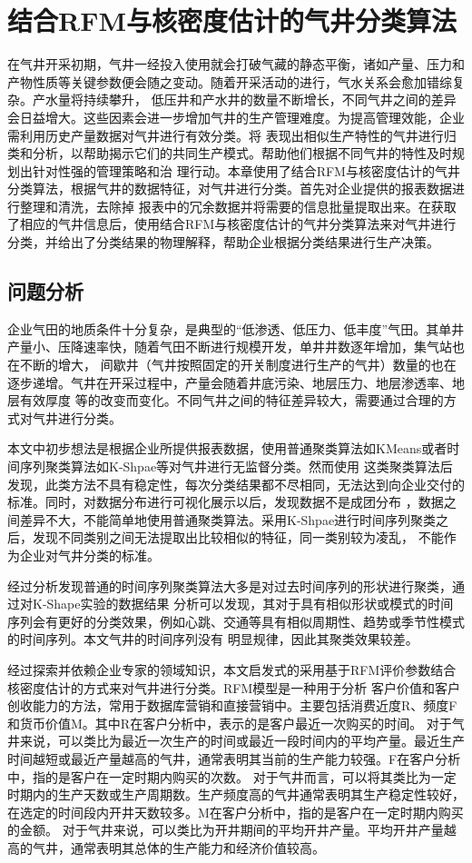 \chapter{结合RFM与核密度估计的气井分类算法}
在气井开采初期，气井一经投入使用就会打破气藏的静态平衡，诸如产量、压力和产物性质等关键参数便会随之变动。随着开采活动的进行，气水关系会愈加错综复杂。产水量将持续攀升，
低压井和产水井的数量不断增长，不同气井之间的差异会日益增大。这些因素会进一步增加气井的生产管理难度。为提高管理效能，企业需利用历史产量数据对气井进行有效分类。将
表现出相似生产特性的气井进行归类和分析，以帮助揭示它们的共同生产模式。帮助他们根据不同气井的特性及时规划出针对性强的管理策略和治
理行动。本章使用了结合RFM与核密度估计的气井分类算法，根据气井的数据特征，对气井进行分类。首先对企业提供的报表数据进行整理和清洗，去除掉
报表中的冗余数据并将需要的信息批量提取出来。在获取了相应的气井信息后，使用结合RFM与核密度估计的气井分类算法来对气井进行分类，并给出了分类结果的物理解释，帮助企业根据分类结果进行生产决策。
\section{问题分析}
企业气田的地质条件十分复杂，是典型的“低渗透、低压力、低丰度”气田。其单井产量小、压降速率快，随着气田不断进行规模开发，单井井数逐年增加，集气站也在不断的增大，
间歇井（气井按照固定的开关制度进行生产的气井）数量的也在逐步递增。气井在开采过程中，产量会随着井底污染、地层压力、地层渗透率、地层有效厚度
等的改变而变化。不同气井之间的特征差异较大，需要通过合理的方式对气井进行分类。

本文中初步想法是根据企业所提供报表数据，使用普通聚类算法如KMeans或者时间序列聚类算法如K-Shpae等对气井进行无监督分类。然而使用
这类聚类算法后发现，此类方法不具有稳定性，每次分类结果都不尽相同，无法达到向企业交付的标准。同时，对数据分布进行可视化展示以后，发现数据不是成团分布
，数据之间差异不大，不能简单地使用普通聚类算法。采用K-Shpae进行时间序列聚类之后，发现不同类别之间无法提取出比较相似的特征，同一类别较为凌乱，
不能作为企业对气井分类的标准。

经过分析发现普通的时间序列聚类算法大多是对过去时间序列的形状进行聚类，通过对K-Shape实验的数据结果\cite{Kshapeexperiment}
分析可以发现，其对于具有相似形状或模式的时间序列会有更好的分类效果，例如心跳、交通等具有相似周期性、趋势或季节性模式的时间序列。本文气井的时间序列没有
明显规律，因此其聚类效果较差。

经过探索并依赖企业专家的领域知识，本文启发式的采用基于RFM评价参数结合核密度估计的方式来对气井进行分类。RFM模型是一种用于分析
客户价值和客户创收能力的方法，常用于数据库营销和直接营销中。主要包括消费近度R、频度F和货币价值M。其中R在客户分析中，表示的是客户最近一次购买的时间。
对于气井来说，可以类比为最近一次生产的时间或最近一段时间内的平均产量。最近生产时间越短或最近产量越高的气井，通常表明其当前的生产能力较强。F在客户分析中，指的是客户在一定时期内购买的次数。
对于气井而言，可以将其类比为一定时期内的生产天数或生产周期数。生产频度高的气井通常表明其生产稳定性较好，在选定的时间段内开井天数较多。M在客户分析中，指的是客户在一定时期内购买的金额。
对于气井来说，可以类比为开井期间的平均开井产量。平均开井产量越高的气井，通常表明其总体的生产能力和经济价值较高。

